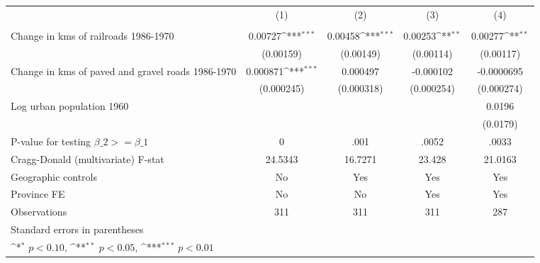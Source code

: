 {
\def\sym#1{\ifmmode^{#1}\else\(^{#1}\)\fi}
\begin{tabular}{l*{4}{c}}
\hline\hline
                &\multicolumn{1}{c}{(1)}&\multicolumn{1}{c}{(2)}&\multicolumn{1}{c}{(3)}&\multicolumn{1}{c}{(4)}\\
                &\multicolumn{1}{c}{}&\multicolumn{1}{c}{}&\multicolumn{1}{c}{}&\multicolumn{1}{c}{}\\
\hline
Change in kms of railroads 1986-1970&  0.00727\sym{***}&  0.00458\sym{***}&  0.00253\sym{**} &  0.00277\sym{**} \\
                &(0.00159)         &(0.00149)         &(0.00114)         &(0.00117)         \\
[1em]
Change in kms of paved and gravel roads 1986-1970& 0.000871\sym{***}& 0.000497         &-0.000102         &-0.0000695         \\
                &(0.000245)         &(0.000318)         &(0.000254)         &(0.000274)         \\
[1em]
Log urban population 1960&                  &                  &                  &   0.0196         \\
                &                  &                  &                  & (0.0179)         \\
\hline
P-value for testing $\beta\_{2} >= \beta\_{1}$&        0         &     .001         &    .0052         &    .0033         \\
Cragg-Donald (multivariate) F-stat&  24.5343         &  16.7271         &   23.428         &  21.0163         \\
Geographic controls&       No         &      Yes         &      Yes         &      Yes         \\
Province FE     &       No         &       No         &      Yes         &      Yes         \\
Observations    &      311         &      311         &      311         &      287         \\
\hline\hline
\multicolumn{5}{l}{\footnotesize Standard errors in parentheses}\\
\multicolumn{5}{l}{\footnotesize \sym{*} \(p<0.10\), \sym{**} \(p<0.05\), \sym{***} \(p<0.01\)}\\
\end{tabular}
}
